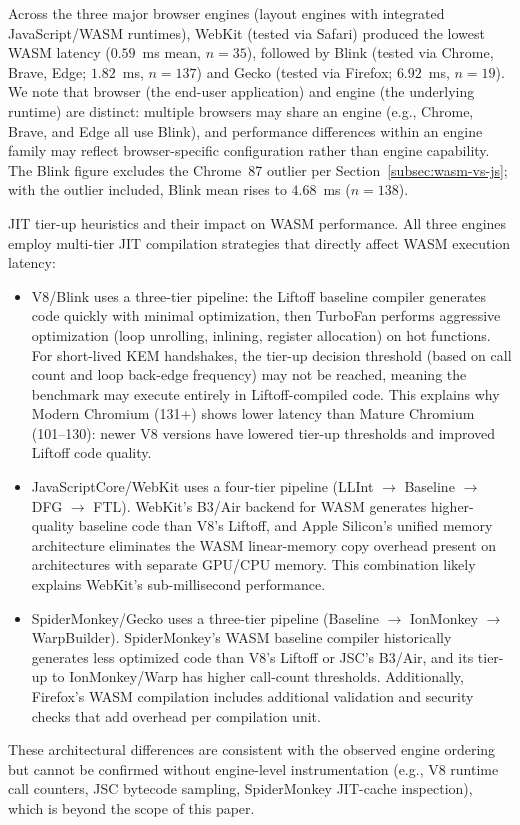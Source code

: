 \documentclass[11pt,a4paper]{article}
\def\textbf#1{#1}%
\begin{document}
Across the three major \textbf{browser engines} (layout engines with integrated JavaScript/WASM runtimes), WebKit (tested via Safari) produced the lowest WASM latency ($0.59$~ms mean, $n=35$), followed by Blink (tested via Chrome, Brave, Edge; $1.82$~ms, $n=137$) and Gecko (tested via Firefox; $6.92$~ms, $n=19$). We note that \textbf{browser} (the end-user application) and \textbf{engine} (the underlying runtime) are distinct: multiple browsers may share an engine (e.g., Chrome, Brave, and Edge all use Blink), and performance differences within an engine family may reflect browser-specific configuration rather than engine capability. The Blink figure excludes the Chrome~87 outlier per Section~\ref{subsec:wasm-vs-js}; with the outlier included, Blink mean rises to $4.68$~ms ($n=138$).

\textbf{JIT tier-up heuristics and their impact on WASM performance.} All three engines employ multi-tier JIT compilation strategies that directly affect WASM execution latency:
\begin{itemize}
    \item \textbf{V8/Blink} uses a three-tier pipeline: the Liftoff baseline compiler generates code quickly with minimal optimization, then TurboFan performs aggressive optimization (loop unrolling, inlining, register allocation) on hot functions. For short-lived KEM handshakes, the tier-up decision threshold (based on call count and loop back-edge frequency) may not be reached, meaning the benchmark may execute entirely in Liftoff-compiled code. This explains why Modern Chromium (131+) shows lower latency than Mature Chromium (101--130): newer V8 versions have lowered tier-up thresholds and improved Liftoff code quality.
    \item \textbf{JavaScriptCore/WebKit} uses a four-tier pipeline (LLInt $\rightarrow$ Baseline $\rightarrow$ DFG $\rightarrow$ FTL). WebKit's B3/Air backend for WASM generates higher-quality baseline code than V8's Liftoff, and Apple Silicon's unified memory architecture eliminates the WASM linear-memory copy overhead present on architectures with separate GPU/CPU memory. This combination likely explains WebKit's sub-millisecond performance.
    \item \textbf{SpiderMonkey/Gecko} uses a three-tier pipeline (Baseline $\rightarrow$ IonMonkey $\rightarrow$ WarpBuilder). SpiderMonkey's WASM baseline compiler historically generates less optimized code than V8's Liftoff or JSC's B3/Air, and its tier-up to IonMonkey/Warp has higher call-count thresholds. Additionally, Firefox's WASM compilation includes additional validation and security checks that add overhead per compilation unit.
\end{itemize}
These architectural differences are consistent with the observed engine ordering but \textbf{cannot be confirmed without engine-level instrumentation} (e.g., V8 runtime call counters, JSC bytecode sampling, SpiderMonkey JIT-cache inspection), which is beyond the scope of this paper.
\end{document}
